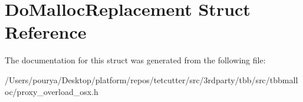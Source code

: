 \hypertarget{structDoMallocReplacement}{}\section{Do\+Malloc\+Replacement Struct Reference}
\label{structDoMallocReplacement}


The documentation for this struct was generated from the following file\+:\begin{DoxyCompactItemize}
\item 
/\+Users/pourya/\+Desktop/platform/repos/tetcutter/src/3rdparty/tbb/src/tbbmalloc/proxy\+\_\+overload\+\_\+osx.\+h\end{DoxyCompactItemize}
